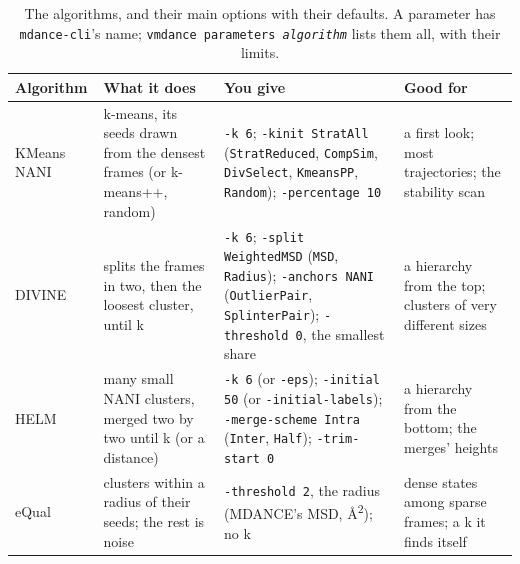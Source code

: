 \documentclass[11pt,letterpaper]{article}
\newcommand{\cmd}[1]{\texttt{#1}}
\newcommand{\Asq}{\AA\textsuperscript{2}}
\newcommand{\meta}[1]{\textrm{\emph{#1}}}
\begin{document}
\begin{table}[H]
\centering
\small
\caption{The algorithms, and their main options with their defaults. A
  parameter has \cmd{mdance-cli}'s name; \cmd{vmdance parameters \meta{algorithm}} lists them all, with their limits.}
\label{tab:algorithms}
\begin{tabularx}{\textwidth}{@{}p{}LLp{0.22\textwidth}@{}}
\toprule
\textbf{Algorithm} & \textbf{What it does} & \textbf{You give} & \textbf{Good for} \\
\midrule
KMeans NANI & k-means, its seeds drawn from the densest frames (or
  k-means++, random) & \cmd{-k 6}; \cmd{-kinit StratAll} (\cmd{StratReduced},
  \cmd{CompSim}, \cmd{DivSelect}, \cmd{KmeansPP}, \cmd{Random});
  \cmd{-percentage 10} & a first look; most trajectories; the stability scan \\
\addlinespace
DIVINE & splits the frames in two, then the loosest cluster, until k &
  \cmd{-k 6}; \cmd{-split WeightedMSD} (\cmd{MSD}, \cmd{Radius});
  \cmd{-anchors NANI} (\cmd{OutlierPair}, \cmd{SplinterPair});
  \cmd{-threshold 0}, the smallest share & a hierarchy from the top; clusters
  of very different sizes \\
\addlinespace
HELM & many small NANI clusters, merged two by two until k (or a distance) &
  \cmd{-k 6} (or \cmd{-eps}); \cmd{-initial 50} (or \cmd{-initial-labels});
  \cmd{-merge-scheme Intra} (\cmd{Inter}, \cmd{Half}); \cmd{-trim-start 0} & a
  hierarchy from the bottom; the merges' heights \\
\addlinespace
eQual & clusters within a radius of their seeds; the rest is noise &
  \cmd{-threshold 2}, the radius (MDANCE's MSD, \Asq); no k & dense states
  among sparse frames; a k it finds itself \\
\bottomrule
\end{tabularx}
\end{table}
\end{document}
